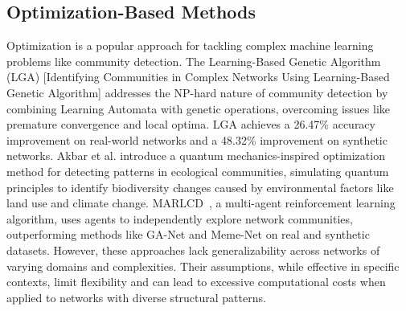 \documentclass{article}
\begin{document}
\subsection{Optimization-Based Methods}
Optimization is a popular approach for tackling complex machine learning problems like community detection. The Learning-Based Genetic Algorithm (LGA)\cite{ABDI2024103031} [Identifying Communities in Complex Networks Using Learning-Based Genetic Algorithm] addresses the NP-hard nature of community detection by combining Learning Automata with genetic operations, overcoming issues like premature convergence and local optima. LGA achieves a 26.47\% accuracy improvement on real-world networks and a 48.32\% improvement on synthetic networks. Akbar et al.\cite{Akbar2021} introduce a quantum mechanics-inspired optimization method for detecting patterns in ecological communities, simulating quantum principles to identify biodiversity changes caused by environmental factors like land use and climate change. MARLCD~\cite{Alipour}, a multi-agent reinforcement learning algorithm, uses agents to independently explore network communities, outperforming methods like GA-Net and Meme-Net on real and synthetic datasets. However, these approaches lack generalizability across networks of varying domains and complexities. Their assumptions, while effective in specific contexts, limit flexibility and can lead to excessive computational costs when applied to networks with diverse structural patterns.
\end{document}

